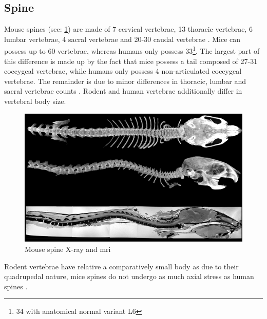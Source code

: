 \subsection{Spine}
\label{s:b-mouse-spine}
Mouse spines (see: \cref{fig:mouseSpine}) are made of 7 cervical vertebrae, 13 thoracic vertebrae, 6 lumbar vertebrae, 4 sacral vertebrae and 20-30 caudal vertebrae \cite{platzerTaschenatlasAnatomieBd2013}.
Mice can possess up to 60 vertebrae, whereas humans only possess 33\footnote{34 with anatomical normal variant L6}.
The largest part of this difference is made up by the fact that mice possess a tail composed of 27-31 coccygeal vertebrae,
while humans only possess 4 non-articulated coccygeal vertebrae.
The remainder is due to minor differences in thoracic, lumbar and sacral vertebrae counts \cite{ruberteMorphologicalMousePhenotyping2017,jeromeSkeletalSystem2018,harrisonVertebralLandmarksIdentification2013}.
Rodent and human vertebrae additionally differ in vertebral body size.
\begin{figure}[h]
	\centerline{
		\includegraphics[scale=0.7]{images/mouseSpine.png}}
	\caption{Mouse spine X-ray and \acrshort{mri} \cite{harrisonVertebralLandmarksIdentification2013}}\label{fig:mouseSpine}
\end{figure}

\noindent
Rodent vertebrae have relative a comparatively small body as due to their quadrupedal nature,
mice spines do not undergo as much axial stress as human spines \cite{ruberteMorphologicalMousePhenotyping2017,jeromeSkeletalSystem2018,platzerTaschenatlasAnatomieBd2013}.

